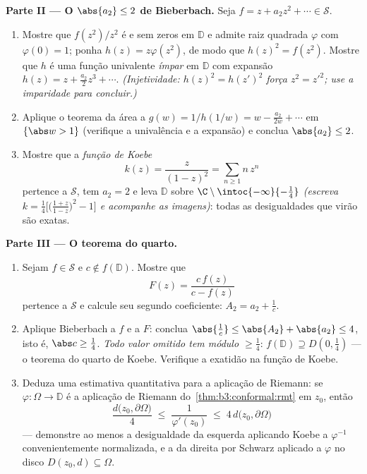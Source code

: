 \begin{problem}
\medskip
\noindent\textbf{Parte II --- O $\abs{a_2} \leq
2$ de Bieberbach.} Seja $f = z + a_2z^2 + \cdots \in \mathcal S$.
\begin{enumerate}[resume]
  \item Mostre que $f(z^2)/z^2$ é  e sem zeros em $\mathbb D$ e admite raiz
        quadrada  $\varphi$ com $\varphi(0) = 1$; ponha $h(z) =
        z\varphi(z^2)$, de modo que
        $h(z)^2 = f(z^2)$. Mostre que $h$ é uma função univalente \emph{ímpar} em
        $\mathbb
        D$ com expansão $h(z) = z + \frac{a_2}2z^3 +
        \cdots$. \emph{(Injetividade: $h(z)^2 = h(z')^2$ força $z^2 = z'^2$;
        use a imparidade para concluir.)}
  \item Aplique o teorema da área a $g(w) = 1/h(1/w) = w -
        \frac{a_2}{2w} + \cdots$ em $\{\abs w > 1\}$ (verifique a
        univalência e a expansão) e conclua $\abs{a_2} \leq 2$.
  \item Mostre que a \emph{função de Koebe}
        \[
        k(z) = \frac{z}{(1 - z)^2} = \sum_{n\geq1}n\,z^n
        \]
        pertence a $\mathcal S$, tem $a_2 = 2$ e leva $\mathbb D$ sobre $\C\setminus\intoc{-\infty}{-\frac14}$
        \emph{(escreva $k = \frac14\bigl[\bigl(\frac{1+z}{1 -
        z}\bigr)^2 - 1\bigr]$ e acompanhe as imagens)}: todas as
        desigualdades que virão são exatas.
\end{enumerate}

\medskip
\noindent\textbf{Parte III --- O teorema do quarto.}
\begin{enumerate}[resume]
  \item Sejam $f \in \mathcal S$ e $c \notin f(\mathbb D)$. Mostre que
        \[
        F(z) = \frac{c\,f(z)}{c - f(z)}
        \]
        pertence a $\mathcal S$ e calcule seu segundo coeficiente: $A_2 = a_2 + \frac1c$.
  \item Aplique Bieberbach a $f$ e a $F$: conclua $\abs{\frac1c} \leq \abs{A_2} + \abs{a_2} \leq 4$, isto é,
        $\abs c \geq \frac14$. \emph{Todo valor omitido tem módulo $\geq \frac14$}: $f(\mathbb D) \supseteq
        D(0, \frac14)$ --- o
        teorema do quarto de Koebe. Verifique a exatidão na função de
        Koebe.
  \item Deduza uma estimativa quantitativa para a aplicação de Riemann:
        se $\varphi \colon \Omega \to \mathbb D$ é a aplicação de Riemann do~\cref{thm:b3:conformal:rmt} em $z_0$,
        então
        \[
        \frac{d\bigl(z_0, \partial\Omega\bigr)}{4}
        \;\leq\; \frac1{\varphi'(z_0)} \;\leq\;
        4\,d\bigl(z_0, \partial\Omega\bigr)
        \]
        --- demonstre ao menos a desigualdade da esquerda aplicando
        Koebe a $\varphi^{-1}$ convenientemente normalizada, e a da direita por
        Schwarz aplicado a $\varphi$ no disco $D(z_0, d) \subseteq \Omega$.
\end{enumerate}


\end{problem}
